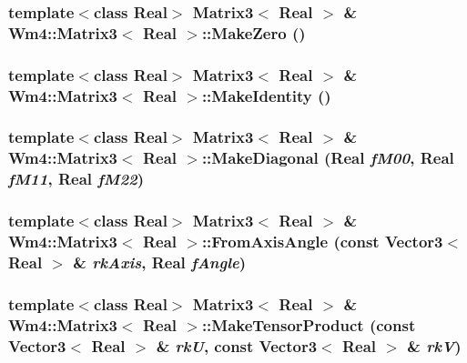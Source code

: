 \subsubsection{\setlength{\rightskip}{0pt plus 5cm}template$<$class Real$>$ {\bf Matrix3}$<$ Real $>$ \& {\bf Wm4::Matrix3}$<$ Real $>$::Make\-Zero ()}\label{classWm4_1_1Matrix3_d04acb7ef7057076bd233fa6bea3084c}


\subsubsection{\setlength{\rightskip}{0pt plus 5cm}template$<$class Real$>$ {\bf Matrix3}$<$ Real $>$ \& {\bf Wm4::Matrix3}$<$ Real $>$::Make\-Identity ()}\label{classWm4_1_1Matrix3_0c2daa985ed0ebf9f73e5c33b182e04a}


\subsubsection{\setlength{\rightskip}{0pt plus 5cm}template$<$class Real$>$ {\bf Matrix3}$<$ Real $>$ \& {\bf Wm4::Matrix3}$<$ Real $>$::Make\-Diagonal (Real {\em f\-M00}, Real {\em f\-M11}, Real {\em f\-M22})}\label{classWm4_1_1Matrix3_3991b89c98a78edd6ccf308daaf2b0fb}


\subsubsection{\setlength{\rightskip}{0pt plus 5cm}template$<$class Real$>$ {\bf Matrix3}$<$ Real $>$ \& {\bf Wm4::Matrix3}$<$ Real $>$::From\-Axis\-Angle (const {\bf Vector3}$<$ Real $>$ \& {\em rk\-Axis}, Real {\em f\-Angle})}\label{classWm4_1_1Matrix3_acab1491959951aa9b1bb98101827f08}


\subsubsection{\setlength{\rightskip}{0pt plus 5cm}template$<$class Real$>$ {\bf Matrix3}$<$ Real $>$ \& {\bf Wm4::Matrix3}$<$ Real $>$::Make\-Tensor\-Product (const {\bf Vector3}$<$ Real $>$ \& {\em rk\-U}, const {\bf Vector3}$<$ Real $>$ \& {\em rk\-V})}\label{classWm4_1_1Matrix3_e4a69415c6e70f9614229c5543785160}


